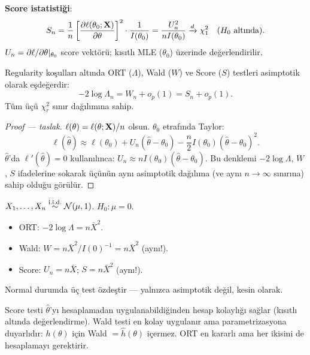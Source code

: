 \begin{tanim}\label{def:score_testi}
\textbf{Score istatistiği}:
\[
  S_n = \frac{1}{n}\left[\frac{\partial\ell(\theta_0;\mathbf{X})}{\partial\theta}\right]^2 \cdot \frac{1}{I(\theta_0)} = \frac{U_n^2}{nI(\theta_0)} \xrightarrow{d}\chi^2_1 \quad (H_0 \text{ altında}).
\]
$U_n = \partial\ell/\partial\theta|_{\theta_0}$ score vektörü; kısıtlı MLE ($\theta_0$) üzerinde değerlendirilir.
\end{tanim}

\begin{teorem}\label{thm:uc_test}
Regularity koşulları altında ORT ($\Lambda$), Wald ($W$) ve Score ($S$) testleri asimptotik olarak eşdeğerdir:
\[
  -2\log\Lambda_n = W_n + o_p(1) = S_n + o_p(1).
\]
Tüm üçü $\chi^2_r$ sınır dağılımına sahip.
\end{teorem}

\begin{proof}[Proof --- taslak]
$\ell(\theta)=\ell(\theta;\mathbf{X})/n$ olsun. $\theta_0$ etrafında Taylor:
\[
  \ell(\hat\theta) \approx \ell(\theta_0) + U_n(\hat\theta-\theta_0) - \frac{n}{2}I(\theta_0)(\hat\theta-\theta_0)^2.
\]
$\hat\theta$'da $\ell'(\hat\theta)=0$ kullanılınca: $U_n \approx nI(\theta_0)(\hat\theta-\theta_0)$. Bu denklemi $-2\log\Lambda$, $W$, $S$ ifadelerine sokarak üçünün aynı asimptotik dağılıma (ve aynı $n\to\infty$ sınırına) sahip olduğu görülür.
\end{proof}

\begin{ornek}
$X_1,\ldots,X_n\overset{\text{i.i.d.}}{\sim}\mathcal{N}(\mu,1)$. $H_0:\mu=0$.
\begin{itemize}
  \item ORT: $-2\log\Lambda = n\bar X^2$.
  \item Wald: $W=n\bar X^2/I(0)^{-1}=n\bar X^2$ (aynı!).
  \item Score: $U_n = n\bar X$; $S = n\bar X^2$ (aynı!).
\end{itemize}
Normal durumda üç test özdeştir --- yalnızca asimptotik değil, kesin olarak.
\end{ornek}

\begin{hataanalizi}
Score testi $\hat\theta$'yı hesaplamadan uygulanabildiğinden hesap kolaylığı sağlar (kısıtlı altında değerlendirme). Wald testi en kolay uygulanır ama parametrizasyona duyarlıdır: $h(\theta)$ için Wald $=\hat h(\theta)$ içermez. ORT en kararlı ama her ikisini de hesaplamayı gerektirir.
\end{hataanalizi}

